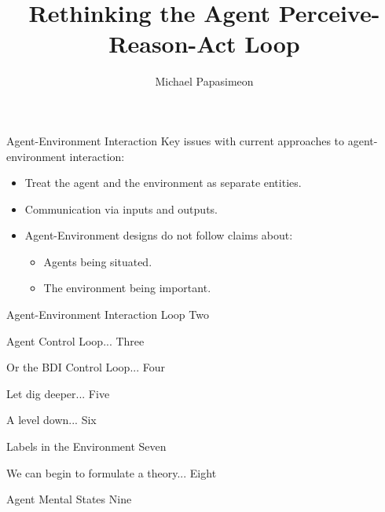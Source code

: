 \documentclass[xcolor=dvipsnames,t]{beamer}
\title[Intelligent Agents]{Rethinking the Agent Perceive-Reason-Act Loop}
\author{Michael Papasimeon}
\date{}
\begin{document}
\begin{frame}
    \maketitle
\end{frame} 

\begin{frame}{Agent-Environment Interaction} 
    Key issues with current approaches to agent-environment interaction:
    \begin{itemize}
        \item Treat the agent and the environment as separate entities.
        \item Communication via inputs and outputs.
        \item Agent-Environment designs do not follow claims about:
            \begin{itemize}
                \item Agents being situated.
                \item The environment being important. 
            \end{itemize} 
    \end{itemize} 
\end{frame} 

\begin{frame}{Agent-Environment Interaction Loop} 
Two
\end{frame} 

\begin{frame}{Agent Control Loop...}
Three
\end{frame} 

\begin{frame}{Or the BDI Control Loop...}
Four
\end{frame} 

\begin{frame}{Let dig deeper...}
Five
\end{frame} 

\begin{frame}{A level down...}
Six
\end{frame} 

\begin{frame}{Labels in the Environment}  
Seven
\end{frame} 

\begin{frame}{We can begin to formulate a theory...}
Eight
\end{frame} 

\begin{frame}{Agent Mental States}
Nine
\end{frame} 
\end{document}
